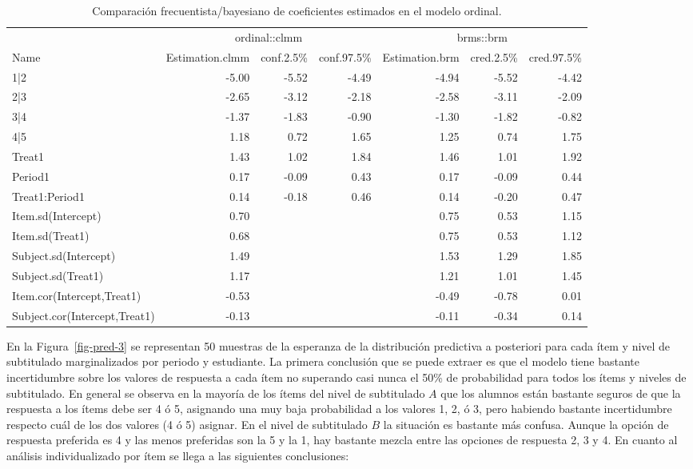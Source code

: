 \documentclass[
  12pt,
  a4paper,
  extrafontsizes,
  onecolumn,
  openright,
  table]{memoir}
\begin{document}
\tiny

\hypertarget{tbl-model-comp}{}
\begin{longtable}{lrrrrrr}
\caption{\label{tbl-model-comp}Comparación frecuentista/bayesiano de coeficientes estimados en el
modelo ordinal. }\tabularnewline

\toprule
 & \multicolumn{3}{c}{ordinal::clmm} & \multicolumn{3}{c}{brms::brm} \\ 
\cmidrule(lr){2-4} \cmidrule(lr){5-7}
Name & Estimation.clmm & conf.2.5\% & conf.97.5\% & Estimation.brm & cred.2.5\% & cred.97.5\% \\ 
\midrule
1|2 & -5.00 & -5.52 & -4.49 & -4.94 & -5.52 & -4.42 \\ 
2|3 & -2.65 & -3.12 & -2.18 & -2.58 & -3.11 & -2.09 \\ 
3|4 & -1.37 & -1.83 & -0.90 & -1.30 & -1.82 & -0.82 \\ 
4|5 & 1.18 & 0.72 & 1.65 & 1.25 & 0.74 & 1.75 \\ 
Treat1 & 1.43 & 1.02 & 1.84 & 1.46 & 1.01 & 1.92 \\ 
Period1 & 0.17 & -0.09 & 0.43 & 0.17 & -0.09 & 0.44 \\ 
Treat1:Period1 & 0.14 & -0.18 & 0.46 & 0.14 & -0.20 & 0.47 \\ 
Item.sd(Intercept) & 0.70 &  &  & 0.75 & 0.53 & 1.15 \\ 
Item.sd(Treat1) & 0.68 &  &  & 0.75 & 0.53 & 1.12 \\ 
Subject.sd(Intercept) & 1.49 &  &  & 1.53 & 1.29 & 1.85 \\ 
Subject.sd(Treat1) & 1.17 &  &  & 1.21 & 1.01 & 1.45 \\ 
Item.cor(Intercept,Treat1) & -0.53 &  &  & -0.49 & -0.78 & 0.01 \\ 
Subject.cor(Intercept,Treat1) & -0.13 &  &  & -0.11 & -0.34 & 0.14 \\ 
\bottomrule
\end{longtable}

\normalsize

En la Figura~\ref{fig-pred-3} se representan 50 muestras de la esperanza
de la distribución predictiva a posteriori para cada ítem y nivel de
subtitulado marginalizados por periodo y estudiante. La primera
conclusión que se puede extraer es que el modelo tiene bastante
incertidumbre sobre los valores de respuesta a cada ítem no superando
casi nunca el 50\% de probabilidad para todos los ítems y niveles de
subtitulado. En general se observa en la mayoría de los ítems del nivel
de subtitulado \(A\) que los alumnos están bastante seguros de que la
respuesta a los ítems debe ser 4 ó 5, asignando una muy baja
probabilidad a los valores 1, 2, ó 3, pero habiendo bastante
incertidumbre respecto cuál de los dos valores (4 ó 5) asignar. En el
nivel de subtitulado \(B\) la situación es bastante más confusa. Aunque
la opción de respuesta preferida es 4 y las menos preferidas son la 5 y
la 1, hay bastante mezcla entre las opciones de respuesta 2, 3 y 4. En
cuanto al análisis individualizado por ítem se llega a las siguientes
conclusiones:
\end{document}

